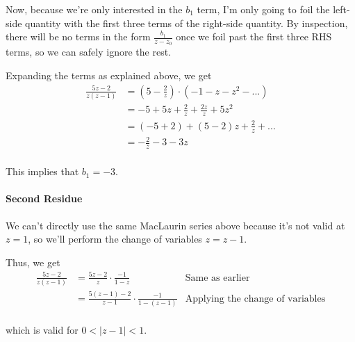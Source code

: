 \documentclass[]{article}
\begin{document}
Now, because we're only interested in the $b_1$ term, I'm only going to foil the left-side quantity with the first three terms of the right-side quantity. By inspection, there will be no terms in the form $\frac{b_1}{z - z_0}$ once we foil past the first three RHS terms, so we can safely ignore the rest.

Expanding the terms as explained above, we get
\[\begin{aligned}
\frac{5z - 2}{z(z-1)}
&= (5 - \frac{2}{z}) \cdot (-1 - z - z^2 - ...) \\
&= -5 + 5z + \frac{2}{z} + \frac{2z}{z} + 5z^2 \\
&= (-5 + 2) + (5 - 2)z + \frac{2}{z} + ... \\
&= -\frac{2}{z} - 3 - 3z \\
\end{aligned}\]

This implies that $b_1 = -3$.

\paragraph{Second Residue} We can't directly use the same MacLaurin series above because it's not valid at $z = 1$, so we'll perform the change of variables $z = z - 1$.

Thus, we get
\[\begin{aligned}
\frac{5z - 2}{z(z-1)}
&= \frac{5z - 2}{z} \cdot \frac{-1}{1-z} &\text{Same as earlier}\\
&= \frac{5(z-1) - 2}{z-1} \cdot \frac{-1}{1 - (z-1)} &\text{Applying the change of variables}\\
\end{aligned}\]

which is valid for $0 < |z - 1| < 1$.
\end{document}

